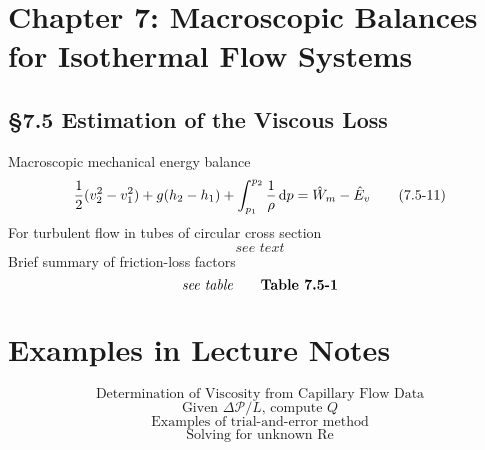 \section{Chapter 7: Macroscopic Balances for Isothermal Flow Systems}
\subsection{\S7.5 Estimation of the Viscous Loss}
Macroscopic mechanical energy balance
\[
	\frac{1}{2}(v_2^2-v_1^2)+g(h_2-h_1)+\int_{p_1}^{p_2}{\frac{1}{\rho}\mathop{}\!\mathrm{d} p}=\hat{W}_m-\hat{E}_v\tag{7.5-11}
\]
For turbulent flow in tubes of circular cross section
\[
	\textit{see text}\tag{7.5-12}
\]
Brief summary of friction-loss factors
\[
	\textit{see table}\tag*{\textbf{Table 7.5-1}}
\]
\section{Examples in Lecture Notes}
\[
	\text{Determination of Viscosity from Capillary Flow Data}\tag{BSL1 2.3-1}
\]
\[
	\text{Given $\Delta\mathscr{P}/L$, compute $Q$}\tag{Lecture notes 9.9}
\]
\[
	\text{Examples of trial-and-error method}\tag{Lecture notes 9.11}
\]
\[
	\text{Solving for unknown Re}\tag{Lecture notes 9.15}
\]